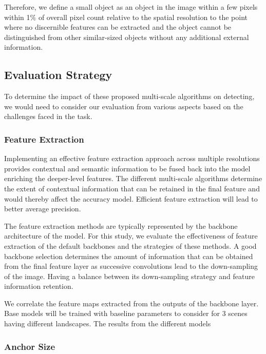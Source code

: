 \documentclass{article}
\begin{document}
Therefore, we define a small object as an object in the image within a few pixels within 1$\%$ of overall pixel count relative to the spatial resolution to the point where no discernible features can be extracted and the object cannot be distinguished from other similar-sized objects without any additional external information.



\subsection{Evaluation Strategy
\label{subsec:evaluation}}

To determine the impact of these proposed multi-scale algorithms on detecting, we would need to consider our evaluation from various aspects based on the challenges faced in the task. 




\subsubsection{Feature Extraction}


Implementing an effective feature extraction approach across multiple resolutions provides contextual and semantic information to be fused back into the model enriching the deeper-level features. The different multi-scale algorithms determine the extent of contextual information that can be retained in the final feature and would thereby affect the accuracy model. Efficient feature extraction will lead to better average precision.

The feature extraction methods are typically represented by the backbone architecture of the model. For this study, we evaluate the effectiveness of feature extraction of the default backbones and the strategies of these methods. A good backbone selection determines the amount of information that can be obtained from the final feature layer as successive convolutions lead to the down-sampling of the image. Having a balance between its down-sampling strategy and feature information retention.

We correlate the feature maps extracted from the outputs of the backbone layer.
Base models will be trained with baseline parameters to consider for 3 scenes having different landscapes. The results from the different models 


\subsubsection{Anchor Size}
\end{document}
